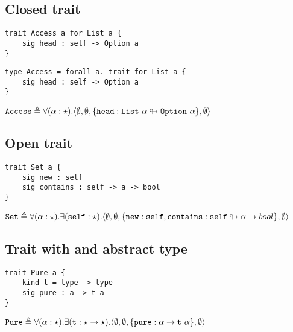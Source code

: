 \documentclass{article}[11pt]
\newcommand{\term}[1]{\verb~#1~}
\begin{document}
    \subsection{Closed trait}\label{subsec:closed-trait}

    \begin{verbatim}
trait Access a for List a {
    sig head : self -> Option a
}
    \end{verbatim}

    \begin{verbatim}
type Access = forall a. trait for List a {
    sig head : self -> Option a
}
    \end{verbatim}

    \noindent\begin{math}
                 \term{Access} \triangleq \forall(\alpha:\star).\langle
                 \emptyset,
                 \emptyset,
                 \{ \term{head} : \term{List}~\alpha \looparrowright \term{Option}~\alpha \},
                 \emptyset
                 \rangle
    \end{math}

    \subsection{Open trait}

    \begin{verbatim}
trait Set a {
    sig new : self
    sig contains : self -> a -> bool
}
    \end{verbatim}

    \noindent
    \begin{math}
        \term{Set} \triangleq \forall(\alpha:\star).\exists(\term{self}:\star).\langle
        \emptyset,
        \emptyset,
        \{ \term{new} : \term{self}, \term{contains} : \term{self} \looparrowright \alpha \rightarrow bool \},
        \emptyset
        \rangle
    \end{math}

    \subsection{Trait with and abstract type}

    \begin{verbatim}
trait Pure a {
    kind t = type -> type
    sig pure : a -> t a
}
    \end{verbatim}

    \noindent
    \begin{math}
        \term{Pure} \triangleq \forall(\alpha:\star).\exists(\term{t}:\star \rightarrow \star).\langle
        \emptyset,
        \emptyset,
        \{ \term{pure} : \alpha \rightarrow \term{t}~\alpha \},
        \emptyset
        \rangle
    \end{math}
\end{document}
